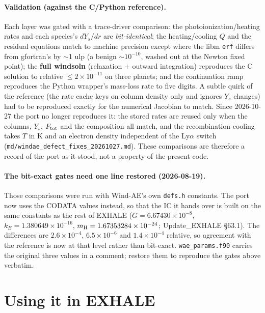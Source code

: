 \documentclass[english,a4paper]{my_memo}
\newcommand{\code}[1]{\texttt{#1}}
\begin{document}
\paragraph{Validation (against the C/Python reference).} Each layer was
gated with a trace-driver comparison:
the photoionization/heating rates and each species's $dY_s/dr$ are
\emph{bit-identical}; the heating/cooling $Q$ and the residual equations
match to machine precision except where the libm \code{erf} differs from
gfortran's by $\sim$1 ulp (a benign $\sim10^{-10}$, washed out at the
Newton fixed point); the \textbf{full windsoln} (relaxation $+$ outward
integration) reproduces the C solution to relative
$\le2\times10^{-11}$ on three planets; and the continuation ramp
reproduces the Python wrapper's mass-loss rate to five digits. A subtle
quirk of the reference (the rate cache keys on column density only and
ignores $Y_s$ changes) had to be reproduced exactly for the numerical
Jacobian to match. Since 2026-10-27 the port no longer reproduces it: the
stored rates are reused only when the columns, $Y_s$, $F_{\rm tot}$ and the
composition all match, and the recombination cooling takes $T$ in K and an
electron density independent of the Ly$\alpha$ switch
(\code{md/windae\_defect\_fixes\_20261027.md}). These comparisons are
therefore a record of the port as it stood, not a property of the present
code.

\paragraph{The bit-exact gates need one line restored (2026-08-19).} Those
comparisons were run with Wind-AE's own \code{defs.h} constants. The port now
uses the CODATA values instead, so that the IC it hands over is built on the
same constants as the rest of EXHALE
($G=6.67430\times10^{-8}$, $k_B=1.380649\times10^{-16}$,
$m_{\rm H}=1.67353284\times10^{-24}$; Update\_EXHALE \S63.1). The differences
are $2.6\times10^{-4}$, $6.5\times10^{-6}$ and $1.4\times10^{-4}$ relative, so
agreement with the reference is now at that level rather than bit-exact.
\code{wae\_params.f90} carries the original three values in a comment; restore
them to reproduce the gates above verbatim.

\section{Using it in EXHALE}\label{sec:use}
\end{document}
